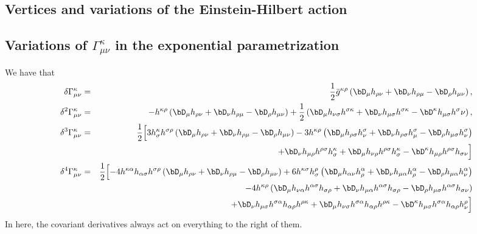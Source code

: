 \documentclass[11pt]{book} %
\newcommand{\bea}{\begin{eqnarray}}
\newcommand{\eea}{\end{eqnarray}}
\numberwithin{equation}{chapter}
\begin{document}
{\begin{appendices}
\chapter{Vertices and variations of the Einstein-Hilbert action}
\label{app:EH}

\section{Variations of $\Gamma_{\mu \nu}^{\kappa}$ in the exponential parametrization}

We have that
\bea
\delta \Gamma_{\mu \nu}^{\kappa} &=& \frac{1}{2}\bar{g}^{\kappa \rho} \left(\bD_{\mu}h_{\rho \nu}+ \bD_{\nu}h_{\rho \mu} - \bD_{\rho}h_{\mu \nu} \right),\\
%
\delta^2 \Gamma_{\mu \nu}^{\kappa} &=&-h^{\kappa \rho}\left(\bD_{\mu}h_{\rho \nu}+ \bD_{\nu}h_{\rho \mu} - \bD_{\rho}h_{\mu \nu} \right)+ \frac{1}{2}\left(\bD_{\mu}h_{\nu\sigma}h^{\sigma \kappa} + \bD_{\nu} h_{\mu \sigma}h^{\sigma \kappa} - \bD^{\kappa}h_{\mu \sigma}h^{\sigma}{\nu} \right),\\
%
\delta^3 \Gamma_{\mu \nu}^{\kappa} &=&\frac{1}{2}\Bigl[ 3 h^{\kappa}_{\sigma} h^{\sigma \rho}\left(\bD_{\mu}h_{\rho \nu}+ \bD_{\nu}h_{\rho \mu} - \bD_{\rho}h_{\mu \nu} \right) -3 h^{\kappa \rho} \left(\bD_{\mu}h_{\rho \sigma}h^{\sigma}_{\nu}+ \bD_{\nu}h_{\rho \sigma}h^{\sigma}_{\mu} - \bD_{\rho}h_{\mu \sigma}h^{\sigma}_{\nu} \right)\nonumber\\
&{}& +\bD_{\nu}h_{\mu \rho}h^{\rho \sigma}h_{\sigma}^{\kappa} + \bD_{\mu}h_{\nu \rho}h^{\rho \sigma}h_{\sigma}^{\kappa}- \bD^{\kappa}h_{\mu \rho}h^{\rho \sigma}h_{\sigma\nu}\Bigr]\\
\delta^4 \Gamma_{\mu \nu}^{\kappa}&=& \frac{1}{2}\Bigl[ - 4 h^{\kappa \alpha}h_{\alpha \sigma}h^{\sigma \rho}\left(\bD_{\mu}h_{\rho \nu}+ \bD_{\nu}h_{\rho \mu} - \bD_{\rho}h_{\mu \nu} \right) + 6 h^{\kappa \sigma}h_{\sigma}^{\rho} \left( \bD_{\mu}h_{\alpha \nu}h^{\alpha}_{\rho} +\bD_{\nu} h_{\mu \alpha}h^{\alpha}_{\rho} - \bD_{\rho}h_{\mu \alpha}h^{\alpha}_{\nu}\right)\nonumber\\
&{}& - 4h^{\kappa \rho}\left( \bD_{\mu}h_{\nu \alpha}h^{\alpha \sigma}h_{\sigma\rho} + \bD_{\nu}h_{\mu \alpha}h^{\alpha \sigma}h_{\sigma\rho}- \bD_{\rho}h_{\mu \sigma}h^{\alpha \sigma}h_{\sigma \nu} \right) \nonumber\\
&{}&+ \bD_{\nu}h_{\mu \sigma}h^{\sigma \alpha}h_{\alpha\rho}h^{\rho \kappa}+\bD_{\mu}h_{\nu \sigma}h^{\sigma \alpha}h_{\alpha\rho}h^{\rho \kappa} - \bD^{\kappa}h_{\mu \sigma}h^{\sigma \alpha}h_{\alpha \rho}h^{\rho}_{\nu}\Bigr]
\eea
In here, the covariant derivatives always act on everything to the right of them.


\end{appendices}}
\end{document}
